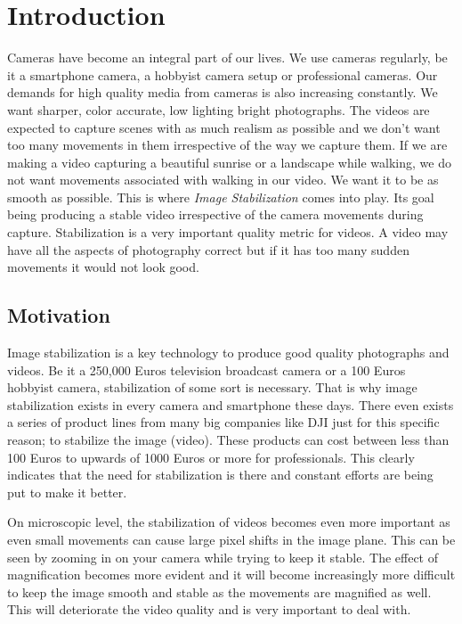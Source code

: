 \chapter{Introduction} \label{chapter_one}

Cameras have become an integral part of our lives. We use cameras regularly, be it a smartphone camera, a hobbyist camera setup or professional cameras. Our demands for high quality media from cameras is also increasing constantly. We want sharper, color accurate, low lighting bright photographs. The videos are expected to capture scenes with as much realism as possible and we don't want too many movements in them irrespective of the way we capture them. If we are making a video capturing a beautiful sunrise or a landscape while walking, we do not want movements associated with walking in our video. We want it to be as smooth as possible. This is where \textit{Image Stabilization} comes into play. Its goal being producing a stable video irrespective of the camera movements during capture. Stabilization is a very important quality metric for videos. A video may have all the aspects of photography correct but if it has too many sudden movements it would not look good.

\section{Motivation}

Image stabilization is a key technology to produce  good quality photographs and videos. Be it a 250,000 Euros television broadcast camera or a 100 Euros hobbyist camera, stabilization of some sort is necessary. That is why image stabilization exists in every camera and smartphone these days. There even exists a series of product lines from many big companies like DJI just for this specific reason; to stabilize the image (video). These products can cost between less than 100 Euros to upwards of 1000 Euros or more for professionals. This clearly indicates that the need for stabilization is there and constant efforts are being put to make it better.

On microscopic level, the stabilization of videos becomes even more important as even small movements can cause large pixel shifts in the image plane. This can be seen by zooming in on your camera while trying to keep it stable. The effect of magnification becomes more evident and it will become increasingly more difficult to keep the image smooth and stable as the movements are magnified as well. This will deteriorate the video quality and is very important to deal with. 


